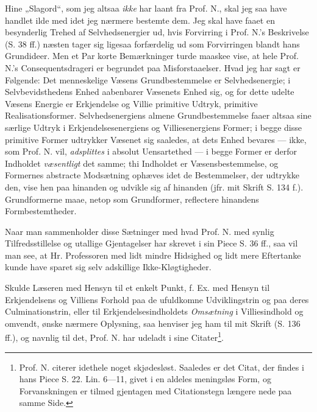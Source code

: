 \documentclass[12pt,a4paper]{book}
\newcommand{\opage}[1]{\marginnote{\footnotesize\textit{[#1]}}}
\begin{document}
Hine „Slagord“, som jeg altsaa \emph{ikke} har laant fra Prof. N., skal jeg saa
have handlet ilde med idet jeg nærmere bestemte dem. Jeg skal have faaet en
besynderlig Trehed af Selvhedsenergier ud, hvis Forvirring i Prof. N.'s
Beskrivelse (S. 38 ff.) næsten tager sig ligesaa forfærdelig ud som Forvirringen
blandt hans Grundideer. Men et Par korte Bemærkninger turde maaskee vise, at hele
Prof. N.'s Consequentsdrageri er begrundet paa Misforstaaelser. Hvad jeg har sagt
er Følgende: Det menneskelige Væsens Grundbestemmelse er Selvhedsenergie; i
Selvbevidsthedens Enhed aabenbarer Væsenets Enhed sig, og for dette udelte
Væsens Energie er Erkjendelse og Villie primitive Udtryk, primitive
Realisationsformer. Selvhedsenergiens almene Grundbestemmelse faaer altsaa sine
særlige Udtryk i Erkjendelsesenergiens og Villiesenergiens Former; i begge disse
primitive Former udtrykker Væsenet sig saaledes, at dets Enhed bevares --- ikke,
som Prof. N. vil, \emph{adsplittes} i absolut Uensartethed --- i begge Former er
derfor Indholdet \emph{væsentligt} det samme; thi Indholdet er
Væsensbestemmelse, og Formernes abstracte Modsætning ophæves idet de
Bestemmelser, der udtrykke den, vise hen paa hinanden og udvikle sig af hinanden
(jfr. mit
\opage{15} \setcounter{footnote}{0}
Skrift S. 134 f.). Grundformerne maae, netop som Grundformer, reflectere
hinandens Formbestemtheder.

Naar man sammenholder disse Sætninger med hvad Prof. N. med synlig
Tilfredsstillelse og utallige Gjentagelser har skrevet i sin Piece S. 36 ff., saa
vil man see, at Hr. Professoren med lidt mindre Hidsighed og lidt mere
Eftertanke kunde have sparet sig selv adskillige Ikke-Kløgtigheder.

Skulde Læseren med Hensyn til et enkelt Punkt, f. Ex. med Hensyn til
Erkjendelsens og Villiens Forhold paa de ufuldkomne Udviklingstrin og paa deres
Culminationstrin, eller til Erkjendelsesindholdets \emph{Omsætning} i
Villiesindhold og omvendt, ønske nærmere Oplysning, saa henviser jeg ham til mit
Skrift (S. 136 ff.), og navnlig til det, Prof. N. har udeladt i sine
Citater\footnote{%
  Prof. N. citerer idethele noget skjødesløst. Saaledes er det Citat, der findes
  i hans Piece S. 22. Lin. 6---11, givet i en aldeles meningsløs Form, og
  Forvanskningen er tilmed gjentagen med Citationstegn længere nede paa samme
  Side.}.
\end{document}
